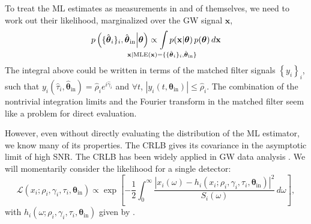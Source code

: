\documentclass{iopart}
\def\clap#1{\hbox to 0pt{\hss#1\hss}}
\def\mathclap{\mathpalette\mathclapinternal}
\def\mathclapinternal#1#2{\clap{$\mathsurround=0pt#1{#2}$}}
\begin{document}
To treat the ML estimates as measurements in and of themselves, we need to work out their likelihood, marginalized over the GW signal $\mathbf{x}$,
%
\begin{equation}\label{eq:detection-candidate-likelihood}
    p\left(\{\hat{\boldsymbol\theta}_i\}_i,
        \hat{\boldsymbol\theta}_\mathrm{in}
    \middle| \boldsymbol\theta\right)
    \propto \int\limits_{\mathclap{\mathbf{x} | \mathrm{MLE}(\mathbf{x}) =
        \{\{\hat{\boldsymbol\theta}_i\}_i,
        \hat{\boldsymbol\theta}_\mathrm{in}\}}}
    p(\mathbf{x} | \boldsymbol\theta) \, p(\boldsymbol\theta)
    \, d\mathbf{x}
\end{equation}
%
The integral above could be written in terms of the matched filter signals $\left\{y_i\right\}_i$, such that $y_i\left(\hat\tau_i, \hat{\boldsymbol\theta}_\mathrm{in}\right) = \hat\rho_i e^{i \hat\gamma_i}$ and $\forall t$, $\left|y_i(t, \boldsymbol\theta_\mathrm{in})\right| \leq \hat\rho_i$. The combination of the nontrivial integration limits and the Fourier transform in the matched filter seem like a problem for direct evaluation.

However, even without directly evaluating the distribution of the \ac{ML} estimator, we know many of its properties. The \ac{CRLB} gives its covariance in the asymptotic limit of high \ac{SNR}. The \ac{CRLB} has been widely applied in \ac{GW} data analysis \cite{fairhurst:2009}. We will momentarily consider the likelihood for a single detector:
%
\begin{equation}\label{eq:gaussian-likelihood-spa}
    \mathcal{L}\left(x_i; \rho_i, \gamma_i, \tau_i,
        \boldsymbol\theta_\mathrm{in}\right)
    \propto \exp \left[
        - \frac{1}{2} \int_0^\infty \frac{\left|x_i (\omega)
            - h_i\left(x_i; \rho_i, \gamma_i, \tau_i,
                \boldsymbol\theta_\mathrm{in}\right)
        \right|^2}{S_i(\omega)} \, d\omega
    \right],
\end{equation}
%
with $h_i(\omega; \rho_i, \gamma_i, \tau_i, \boldsymbol\theta_\mathrm{in})$ given by .
\end{document}
